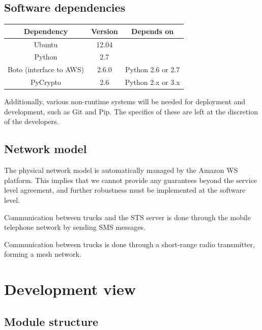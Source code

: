 \documentclass[a4paper,11pt]{report}
\begin{document}
\subsection{Software dependencies}
\label{sec:softw-depend}


\begin{center}
\begin{tabular}{c|c|c}
  \textbf{Dependency} & \textbf{Version} & \textbf{Depends on} \\\hline
  Ubuntu & 12.04 & \\
  Python & 2.7 & \\
  Boto (interface to AWS) & 2.6.0 & Python 2.6 or 2.7 \\
  PyCrypto & 2.6 & Python 2.x or 3.x
\end{tabular}
\end{center}

Additionally, various non-runtime systems will be needed for
deployment and development, such as Git and Pip.  The specifics of
these are left at the discretion of the developers.

\subsection{Network model}
\label{sec:network-model}


The physical network model is automatically managed by the Amazon WS
platform.  This implies that we cannot provide any guarantees beyond
the service level agreement, and further robustness must be
implemented at the software level.

Communication between trucks and the STS server is done through the
mobile telephone network by sending SMS messages.

Communication between trucks is done through a short-range radio
transmitter, forming a mesh network.

\section{Development view}
\label{sec:development-view}


\subsection{Module structure}
\label{sec:module-structure}
\end{document}
